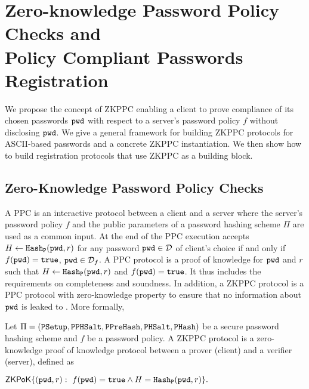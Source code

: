\section[ZKPPC and Password Registration]{Zero-knowledge Password Policy Checks and\\ Policy Compliant Passwords Registration} \label{sec:zkppc}

We propose the concept of \ac{ZKPPC} enabling a client to prove compliance of its chosen passwords $\mathtt{pwd}$ with respect to a server's password policy $f$ without disclosing $\mathtt{pwd}$. 
We give a general framework for building \ac{ZKPPC} protocols for \ac{ASCII}-based passwords and a concrete \ac{ZKPPC} instantiation. 
We then show how to build registration protocols that use \ac{ZKPPC} as a building block.

\subsection{Zero-Knowledge Password Policy Checks}
A \ac{PPC} is an interactive protocol between a client \Client and a server \Server where the server's password policy $f$ and the public parameters of a password hashing scheme $\Pi$ are used as a common input. 
At the end of the \ac{PPC} execution \Server accepts $H\gets \mathtt{Hash_P}(\mathtt{pwd},r)$ for any password $\mathtt{pwd}\in\mathcal{D}$ of client's choice if and only if $f(\mathtt{pwd})=\mathtt{true}$, \ie $\mathtt{pwd}\in\mathcal{D}_f$. 
A \ac{PPC} protocol is a proof of knowledge for $\mathtt{pwd}$ and $r$ such that $H\gets \mathtt{Hash_P}(\mathtt{pwd},r)$ and $f(\mathtt{pwd})=\mathtt{true}$. 
It thus includes the requirements on completeness and soundness. 
In addition, a \ac{ZKPPC} protocol is a \ac{PPC} protocol with zero-knowledge property to ensure that no information about $\mathtt{pwd}$ is leaked to \Server. 
More formally, %

\begin{definition}[ZKPPC]\label{def:pocopas}
Let $\Pi=(\mathtt{PSetup},\allowbreak\mathtt{PPHSalt},\allowbreak\mathtt{PPreHash},\mathtt{PHSalt},\allowbreak\mathtt{PHash})$ be a secure password hashing scheme and $f$ be a password policy. A \ac{ZKPPC} protocol is a zero-knowledge proof of knowledge protocol between a prover \Client (client) and a verifier \Server (server), defined as
\begin{center}$\mathsf{ZKPoK}\{(\mathtt{pwd},r):~f(\mathtt{pwd})=\mathtt{true} \wedge H=\mathtt{Hash_P}(\mathtt{pwd},r)\}.$\end{center}
\eod
\end{definition}

